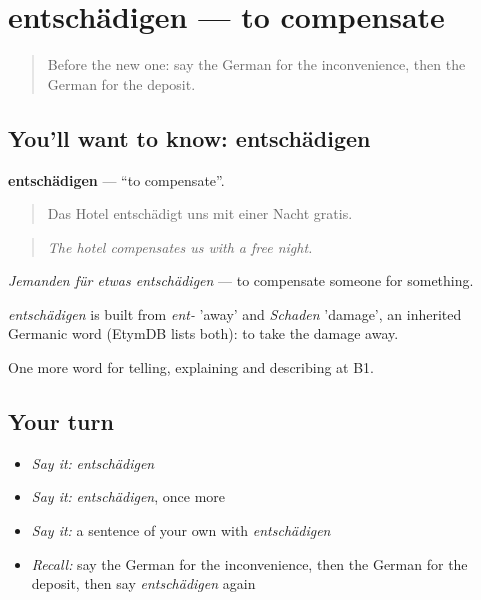 \section[entschädigen]{entschädigen — to compensate}

\label{lesson:GE-C432-entschaedigen}



\begin{quote}
Before the new one: say the German for the inconvenience, then the German for the deposit.
\end{quote}

\subsection*{You'll want to know: entschädigen}
\textbf{entschädigen} — \textquotedblleft{}to compensate\textquotedblright{}.

\begin{quote}
Das Hotel entschädigt uns mit einer Nacht gratis.
\end{quote}

\begin{quote}
\emph{The hotel compensates us with a free night.}
\end{quote}

\emph{Jemanden für etwas entschädigen} — to compensate someone for something.

\begin{cousinweb}
\emph{entschädigen} is built from \emph{ent-} 'away' and \emph{Schaden} 'damage', an inherited Germanic word (EtymDB lists both): to take the damage away.
\end{cousinweb}

\begin{grammarlens}[title={What you've built}]
One more word for telling, explaining and describing at B1.
\end{grammarlens}

\subsection*{Your turn}
\begin{itemize}
\raggedright
  \item \emph{Say it:} \emph{entschädigen}
  \item \emph{Say it:} \emph{entschädigen}, once more
  \item \emph{Say it:} a sentence of your own with \emph{entschädigen}
  \item \emph{Recall:} say the German for the inconvenience, then the German for the deposit, then say \emph{entschädigen} again
\end{itemize}

